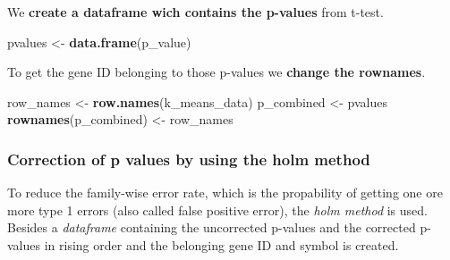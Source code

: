 \documentclass[]{article}
\newenvironment{Shaded}{\begin{snugshade}}{\end{snugshade}}
\newcommand{\KeywordTok}[1]{\textcolor[rgb]{0.13,0.29,0.53}{\textbf{#1}}}
\newcommand{\DecValTok}[1]{\textcolor[rgb]{0.00,0.00,0.81}{#1}}
\newcommand{\StringTok}[1]{\textcolor[rgb]{0.31,0.60,0.02}{#1}}
\newcommand{\OtherTok}[1]{\textcolor[rgb]{0.56,0.35,0.01}{#1}}
\newcommand{\ControlFlowTok}[1]{\textcolor[rgb]{0.13,0.29,0.53}{\textbf{#1}}}
\newcommand{\OperatorTok}[1]{\textcolor[rgb]{0.81,0.36,0.00}{\textbf{#1}}}
\newcommand{\NormalTok}[1]{#1}
\begin{document}
\begin{Shaded}
\end{Shaded}

We \textbf{create a dataframe wich contains the p-values} from t-test.

\begin{Shaded}
\begin{Highlighting}[]
\NormalTok{pvalues <-}\StringTok{ }\KeywordTok{data.frame}\NormalTok{(p_value)}
\end{Highlighting}
\end{Shaded}

To get the gene ID belonging to those p-values we \textbf{change the
rownames}.

\begin{Shaded}
\begin{Highlighting}[]
\NormalTok{row_names <-}\StringTok{ }\KeywordTok{row.names}\NormalTok{(k_means_data)}
\NormalTok{p_combined <-}\StringTok{ }\NormalTok{pvalues}
\KeywordTok{rownames}\NormalTok{(p_combined) <-}\StringTok{ }\NormalTok{row_names}
\end{Highlighting}
\end{Shaded}

\subsubsection{Correction of p values by using the holm
method}\label{correction-of-p-values-by-using-the-holm-method}

To reduce the family-wise error rate, which is the propability of
getting one ore more type 1 errors (also called false positive error),
the \emph{holm method} is used. Besides a \emph{dataframe} containing
the uncorrected p-values and the corrected p-values in rising order and
the belonging gene ID and symbol is created.
\end{document}
